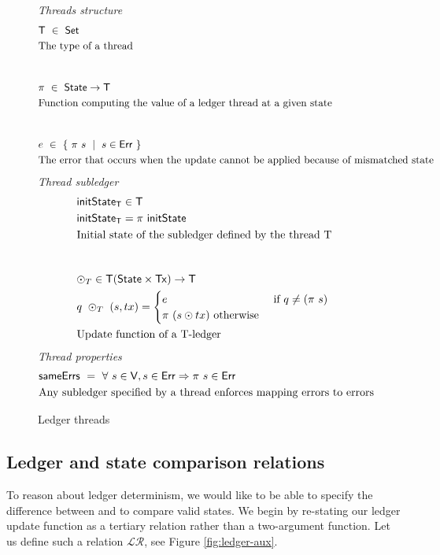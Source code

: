 \begin{figure*}[htb]
  \emph{Threads structure}
  \begin{align*}
    & \T ~\in~ \Set \\
    & \text{The type of a thread} \\
    \nextdef
    & \pi ~\in~ \State \to \T \\
    & \text{Function computing the value of a ledger thread at a given state} \\
    \nextdef
    & e ~\in~ \{~\pi~ s ~\mid~ s \in \Err~\} \\
    & \text{The error that occurs when the update cannot be applied because of mismatched state} \\
  \end{align*}
  \emph{Thread subledger}
  \begin{align*}
    & \fun{initState}_{\T} \in \T \\
    & \fun{initState}_{\T} = \pi ~\fun{initState} \\
    & \text{Initial state of the subledger defined by the thread T} \\
    \nextdef
    & \odot_T \in \T (\State \times \Tx) \to \T \\
    & q~\odot_T~(s, tx) = \begin{cases}
      e & \text{ if } q \neq (\pi~ s) \\
      \pi~(s \odot tx) \text{ otherwise}
    \end{cases} \\
    & \text{Update function of a T-ledger} \\
  \end{align*}
  \emph{Thread properties}
  \begin{align*}
    & \mathsf{sameErrs} ~=~ \forall~s \in \mathsf{V}, s \in \mathsf{Err} \Rightarrow \pi~s \in \mathsf{Err} \\
    & \text{Any subledger specified by a thread enforces mapping errors to errors} \\
  \end{align*}
  \caption{Ledger threads}
  \label{fig:ledger-thread}
\end{figure*}

\pagebreak

\subsection{Ledger and state comparison relations}
\label{sec:relations}

To reason about ledger determinism, we would like to be able to specify the difference between
and to compare valid states. We begin by re-stating our ledger update function as
a tertiary relation rather than a two-argument function. Let us define
such a relation $\mathcal{LR}$, see Figure \ref{fig:ledger-aux}.

